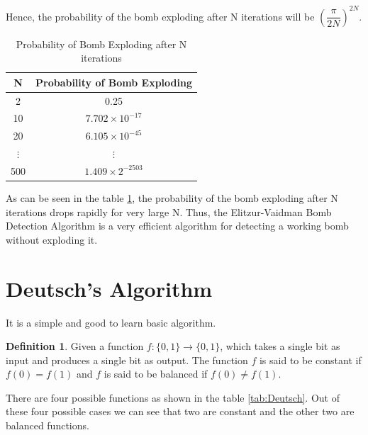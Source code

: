 \documentclass[12pt, oneside]{book}
\theoremstyle{definition}
\newtheorem{definition}{Definition}[section]
\theoremstyle{definition}
\theoremstyle{remark}
\begin{document}
\begin{enumerate}
    Hence, the probability of the bomb exploding after N iterations will be $\left(\dfrac{\pi}{2N}\right)^{2N}$.
    \begin{table}[H]
        \centering
        \begin{tabular}{|c|c|}
            \hline
            N & Probability of Bomb Exploding \\
            \hline
            2 & 0.25 \\
            10 & $7.702 \times 10^{-17}$  \\
            20 & $6.105 \times 10^{-45}$ \\
            $\vdots$ & $\vdots$ \\
            500 & $1.409 \times 2^{-2503}$ \\
            \hline
        \end{tabular}
        \caption{Probability of Bomb Exploding after N iterations}
        \label{tab:Prob}
    \end{table}
    As can be seen in the table \ref{tab:Prob}, the probability of the bomb exploding after N iterations drops rapidly for very large N. Thus, the Elitzur-Vaidman Bomb Detection Algorithm is a very efficient algorithm for detecting a working bomb without exploding it.
\end{enumerate}

\section{Deutsch's Algorithm}
It is a simple and good to learn basic algorithm.
\begin{definition}
    Given a function $f:\{0,1\}\rightarrow\{0,1\}$, which takes a single bit as input and 
    produces a single bit as output. The function $f$ is said to be constant if $f(0)=f(1)$ and $f$ is said to be balanced if $f(0)\neq f(1)$.
\end{definition}

There are four possible functions as shown in the table \ref{tab:Deutsch}. Out of these four possible cases we can see that two are constant and the other two are balanced functions.
\end{document}
